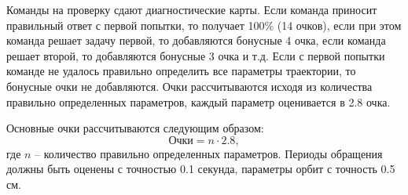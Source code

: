 Команды на проверку сдают диагностические карты. Если команда приносит правильный ответ с первой попытки, то получает 100\% (14 очков), если при этом команда решает задачу первой, то добавляются бонусные 4 очка, если команда решает второй, то добавляются бонусные 3 очка и т.д. Если с первой попытки команде не удалось правильно определить все параметры траектории, то бонусные очки не добавляются. Очки рассчитываются исходя из количества правильно определенных параметров, каждый параметр оценивается в 2.8 очка. 

Основные очки рассчитываются следующим образом:
$$\text{Очки} = n \cdot 2.8,$$
где $n$ – количество правильно определенных параметров. Периоды обращения должны быть оценены с точностью 0.1 секунда, параметры орбит с точность 0.5 см.

